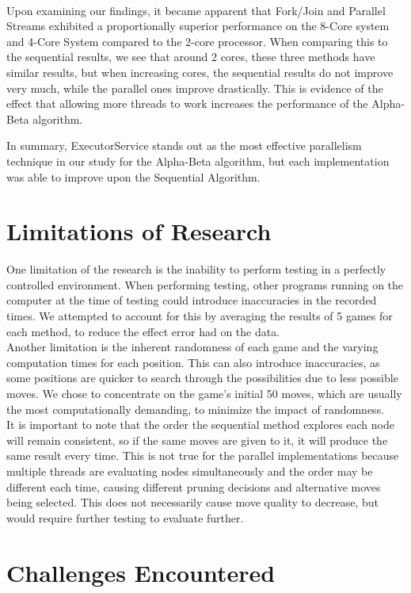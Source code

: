 \documentclass[conference, 11pt]{IEEEtran}
\begin{document}
\\ Upon examining our findings, it became apparent that Fork/Join and Parallel Streams exhibited a proportionally superior performance on the 8-Core system and 4-Core System compared to the 2-core processor. When comparing this to the sequential results, we see that around 2 cores, these three methods have similar results, but when increasing cores, the sequential results do not improve very much, while the parallel ones improve drastically. This is evidence of the effect that allowing more threads to work increases the performance of the Alpha-Beta algorithm.

In summary, ExecutorService stands out as the most effective parallelism technique in our study for the Alpha-Beta algorithm, but each implementation was able to improve upon the Sequential Algorithm.

\section{Limitations of Research}
\vspace{10pt}

One limitation of the research is the inability to perform testing in a perfectly controlled environment. When performing testing, other programs running on the computer at the time of testing could introduce inaccuracies in the recorded times. We attempted to account for this by averaging the results of 5 games for each method, to reduce the effect error had on the data. \\
Another limitation is the inherent randomness of each game and the varying computation times for each position. This can also introduce inaccuracies, as some positions are quicker to search through the possibilities due to less possible moves. We chose to concentrate on the game's initial 50 moves, which are usually the most computationally demanding, to minimize the impact of randomness.\\
It is important to note that the order the sequential method explores each node will remain consistent, so if the same moves are given to it, it will produce the same result every time. This is not true for the parallel implementations because multiple threads are evaluating nodes simultaneously and the order may be different each time, causing different pruning decisions and alternative moves being selected. This does not necessarily cause move quality to decrease, but would require further testing to evaluate further.


\section{Challenges Encountered}
\vspace{10pt}
\end{document}
